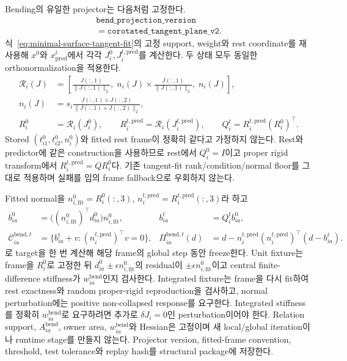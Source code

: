 \documentclass[11pt]{article}
\begin{document}
Bending의 유일한 projector는 다음처럼 고정한다.
\[
\begin{gathered}
  \texttt{bend\_projection\_version}\\[-0.25em]
  =\texttt{corotated\_tangent\_plane\_v2}.
\end{gathered}
\]
식~\eqref{eq:minimal-surface-tangent-fit}의 고정 support, weight와 rest coordinate를 재사용해
\(x^0\)와 \(x_{\mathrm{pred}}^t\)에서 각각 \(J_i^0,J_i^{t,\mathrm{pred}}\)를 계산한다. 두 상태 모두
동일한 orthonormalization을 적용한다.
\begin{equation}
\begin{aligned}
  \mathcal R_i(J)
  &=\left[
    \frac{J(:,1)}{\|J(:,1)\|_2},\;
    n_i(J)\times\frac{J(:,1)}{\|J(:,1)\|_2},\;
    n_i(J)
  \right],\\
  n_i(J)
  &=s_i\frac{J(:,1)\times J(:,2)}{\|J(:,1)\times J(:,2)\|_2},\\
  R_i^0&=\mathcal R_i(J_i^0),\qquad
  R_i^{t,\mathrm{pred}}=\mathcal R_i(J_i^{t,\mathrm{pred}}),\qquad
  Q_i^t=R_i^{t,\mathrm{pred}}(R_i^0)^\top .
\end{aligned}
  \label{eq:minimal-bending-corotated-frame}
\end{equation}
Stored \((t_{i1}^0,t_{i2}^0,n_i^0)\)와 fitted rest frame이 정확히 같다고 가정하지 않는다.
Rest와 predictor에 같은 construction을 사용하므로 rest에서 \(Q_i^0=I\)이고 proper rigid transform에서
\(R_i^{t,\mathrm{pred}}=QR_i^0\)다. 기존 tangent-fit rank/condition/normal floor를 그대로 적용하며
실패를 임의 frame fallback으로 우회하지 않는다.

Fitted normal을
\(n_{i,\mathrm{fit}}^0=R_i^0(:,3)\),
\(n_i^{t,\mathrm{pred}}=R_i^{t,\mathrm{pred}}(:,3)\)라 하고
\begin{equation}
\begin{aligned}
  b_{ia}^0
  &=\bigl((n_{i,\mathrm{fit}}^0)^\top d_{ia}^0\bigr)n_{i,\mathrm{fit}}^0,
  &b_{ia}^t&=Q_i^t b_{ia}^0,\\
  \mathcal C_{ia}^{\mathrm{bend},t}
  &=\{b_{ia}^t+v:(n_i^{t,\mathrm{pred}})^\top v=0\},
  &\Pi_{ia}^{\mathrm{bend},t}(d)
  &=d-n_i^{t,\mathrm{pred}}(n_i^{t,\mathrm{pred}})^\top(d-b_{ia}^t).
\end{aligned}
  \label{eq:minimal-bending-corotated-projector}
\end{equation}
로 target을 한 번 계산해 해당 frame의 global step 동안 freeze한다. Unit fixture는 frame을 \(R_i^0\)로
고정한 뒤 \(d_{ia}^0\pm\epsilon n_{i,\mathrm{fit}}^0\)의 residual이 \(\pm\epsilon n_{i,\mathrm{fit}}^0\)이고
central finite-difference stiffness가 \(w_{ia}^{\mathrm{bend}}\)인지 검사한다. Integrated fixture는 frame을
다시 fit하여 rest exactness와 random proper-rigid reproduction을 검사하고, normal perturbation에는
positive non-collapsed response를 요구한다. Integrated stiffness를 정확히
\(w_{ia}^{\mathrm{bend}}\)로 요구하려면 추가로 \(\delta J_i=0\)인 perturbation이어야 한다.
Relation support, \(A_{ia}^{\mathrm{bend}}\), owner area, \(w_{ia}^{\mathrm{bend}}\)와 Hessian은 고정이며
새 local/global iteration이나 runtime stage를 만들지 않는다. Projector version, fitted-frame convention,
threshold, test tolerance와 replay hash를 structural package에 저장한다.
\end{document}
